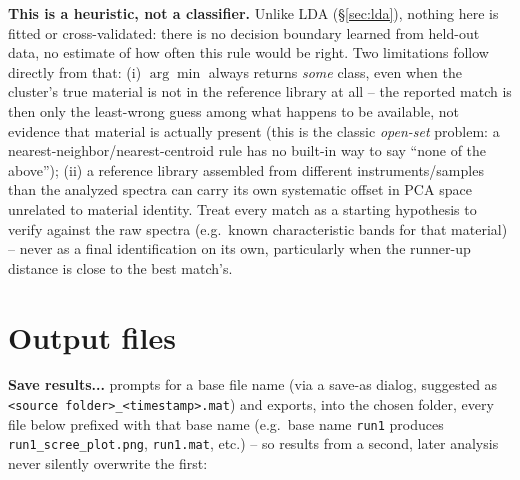 \documentclass[11pt,a4paper]{article}
\newcommand{\code}[1]{\texttt{#1}}
\begin{document}
\begin{tbnote}
\textbf{This is a heuristic, not a classifier.} Unlike LDA
(\S\ref{sec:lda}), nothing here is fitted or cross-validated: there is no
decision boundary learned from held-out data, no estimate of how often
this rule would be right. Two limitations follow directly from that:
(i) $\arg\min$ always returns \emph{some} class, even when the cluster's
true material is not in the reference library at all -- the reported
match is then only the least-wrong guess among what happens to be
available, not evidence that material is actually present (this is the
classic \emph{open-set} problem: a nearest-neighbor/nearest-centroid rule
has no built-in way to say ``none of the above''); (ii) a reference
library assembled from different instruments/samples than the analyzed
spectra can carry its own systematic offset in PCA space unrelated to
material identity. Treat every match as a starting hypothesis to verify
against the raw spectra (e.g.\ known characteristic bands for that
material) -- never as a final identification on its own, particularly
when the runner-up distance is close to the best match's.
\end{tbnote}

\section{Output files}
\label{sec:outputs}
\textbf{Save results...} prompts for a base file name (via a save-as
dialog, suggested as \code{<source folder>\_<timestamp>.mat}) and exports,
into the chosen folder, every file below prefixed with that base name
(e.g.\ base name \code{run1} produces \code{run1\_scree\_plot.png},
\code{run1.mat}, etc.) -- so results from a second, later analysis never
silently overwrite the first:
\end{document}
